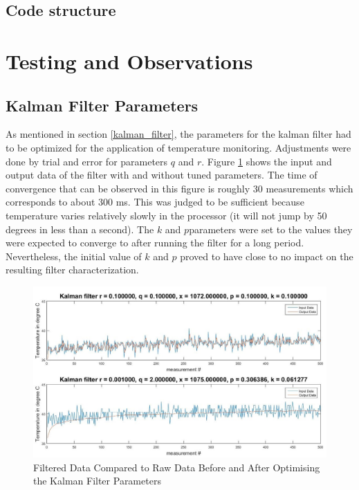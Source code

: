 \documentclass[12pt]{article}
\begin{document}
\subsection{Code structure}


\section{Testing and Observations}

\subsection{Kalman Filter Parameters}\label{kalman_filter_params}
As mentioned in section \ref{kalman_filter}, the parameters for the kalman filter had to be optimized for the application of temperature monitoring. Adjustments were done by trial and error for parameters $q$ and $r$. Figure \ref{fig:kalmanfilter} shows the input and output data of the filter with and without tuned parameters. The time of convergence that can be observed in this figure is roughly 30 measurements which corresponds to about 300 ms. This was judged to be sufficient because temperature varies relatively slowly in the processor (it will not jump by 50 degrees in less than a second). The $k$ and $p $parameters were set to the values they were expected to converge to after running the filter for a long period. Nevertheless, the initial value of $k$ and $p$ proved to have close to no impact on the resulting filter characterization.
\begin{figure}[!htb]
\centering
\includegraphics[scale=0.50]{images/kalmanfilter.jpg}
\caption{Filtered Data Compared to Raw Data Before and After Optimising the Kalman Filter Parameters}
\label{fig:kalmanfilter}
\end{figure}
\end{document}
